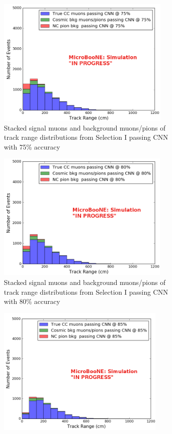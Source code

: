 \begin{figure}[htp!]
\centering
	\begin{subfigure}[b]{.45\textwidth}
	\includegraphics[width=\textwidth, height=2.5in]{figs/sel1mod_cnn_trackrange_acc75_0707.png}
	\caption{Stacked signal muons and background muons/pions of track range distributions from Selection I passing CNN with 75\% accuracy}
	\label{fig:sel1mod_mupi_75stackedcnn}
	\end{subfigure}
	\quad
	\begin{subfigure}[b]{.45\textwidth}
	\includegraphics[width=\textwidth, height=2.5in]{figs/sel1mod_cnn_trackrange_acc80_0707.png}
	\caption{Stacked signal muons and background muons/pions of track range distributions from Selection I passing CNN with 80\% accuracy}
	\label{fig:sel1mod_mupi_80stackedcnn}
	\end{subfigure}
	\quad
	\begin{subfigure}[b]{.45\textwidth}
	\includegraphics[width=\textwidth, height=2.5in]{figs/sel1mod_cnn_trackrange_acc85_0707.png}

\end{subfigure}
\end{figure}
